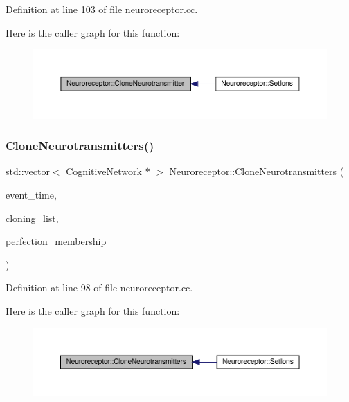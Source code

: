 Definition at line 103 of file neuroreceptor.\+cc.

Here is the caller graph for this function\+:\nopagebreak
\begin{figure}[H]
\begin{center}
\leavevmode
\includegraphics[width=350pt]{class_neuroreceptor_a5629a3d463cc963138ff017ec499720d_icgraph}
\end{center}
\end{figure}
\mbox{\label{class_neuroreceptor_af953abb478f4a3a1843b4b61f9969274}} 
\subsubsection{\texorpdfstring{Clone\+Neurotransmitters()}{CloneNeurotransmitters()}}
{\footnotesize\ttfamily std\+::vector$<$ \hyperlink{class_cognitive_network}{Cognitive\+Network} $\ast$ $>$ Neuroreceptor\+::\+Clone\+Neurotransmitters (\begin{DoxyParamCaption}\item[{std\+::chrono\+::time\+\_\+point$<$ \hyperlink{universe_8h_a0ef8d951d1ca5ab3cfaf7ab4c7a6fd80}{Clock} $>$}]{event\+\_\+time,  }\item[{std\+::vector$<$ \hyperlink{class_cognitive_network}{Cognitive\+Network} $\ast$$>$}]{cloning\+\_\+list,  }\item[{double}]{perfection\+\_\+membership }\end{DoxyParamCaption})}



Definition at line 98 of file neuroreceptor.\+cc.

Here is the caller graph for this function\+:\nopagebreak
\begin{figure}[H]
\begin{center}
\leavevmode
\includegraphics[width=350pt]{class_neuroreceptor_af953abb478f4a3a1843b4b61f9969274_icgraph}
\end{center}
\end{figure}
\mbox{\label{class_neuroreceptor_a5d54ca353f0be78522aacc4fca06db63}} 
